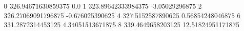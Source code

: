 0 326.94671630859375 0.0
1 323.89642333984375 -3.05029296875
2 326.27069091796875 -0.676025390625
4 327.5152587890625 0.56854248046875
6 331.2872314453125 4.34051513671875
8 339.4649658203125 12.51824951171875
